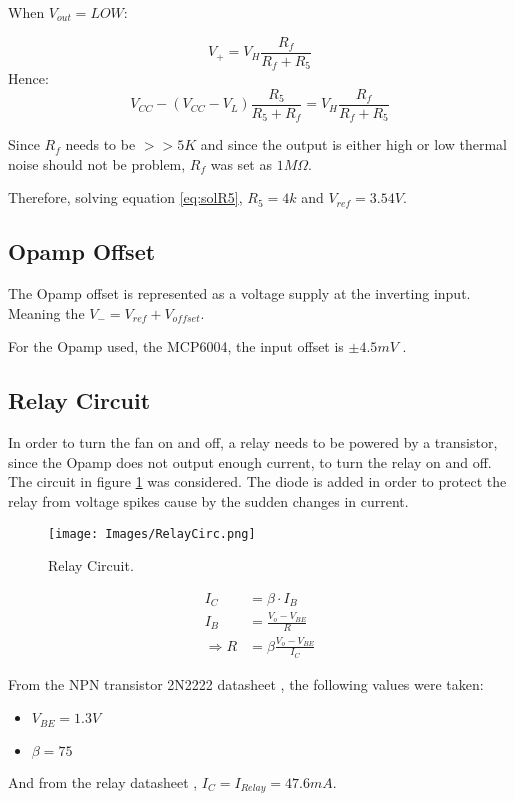 When $V_{out} = LOW$:

\begin{equation}
    V_+ = V_H\frac{R_f}{R_f + R_5}
\end{equation}
Hence:
\begin{equation}
    V_{CC}-\left (V_{CC}-V_L\right )\frac{R_5}{R_5 + R_f} = V_H\frac{R_f}{R_f + R_5}
    \label{eq:solR5}
\end{equation}

Since $R_f$ needs to be $>>5K$ and since the output is either high or low thermal noise should not be problem, $R_f$ was set as $1M\Omega$. 

Therefore, solving equation \ref{eq:solR5}, $R_5 = 4k$ and $V_{ref} = 3.54V$.
\subsection{Opamp Offset}

The Opamp offset is represented as a voltage supply at the inverting input. Meaning the  $V_{-} = V_{ref} + V_{offset}$.

For the Opamp used, the MCP6004, the input offset is $\pm 4.5mV$ \textsuperscript{\cite{MCP6001_datasheet}}. 

\subsection{Relay Circuit}
In order to turn the fan on and off, a relay needs to be powered by a transistor, since the Opamp does not output enough current, to turn the relay on and off. The circuit in figure \ref{fig:RelayCirc} was considered. The diode is added in order to protect the relay from voltage spikes cause by the sudden changes in current.

\begin{figure}[H]
    \centering
    \texttt{[image: Images/RelayCirc.png]}
    \caption{Relay Circuit.}
    \label{fig:RelayCirc}
\end{figure}

\begin{equation}
    \begin{aligned}
        I_C &= \beta \cdot I_B\\
        I_B &= \frac{V_o - V_{BE}}{R}\\ 
        \Rightarrow R &= \beta \frac{V_o - V_{BE}}{I_C}
    \end{aligned}
\end{equation}

From the NPN transistor 2N2222 datasheet \textsuperscript{\cite{2N2222_datasheet}}, the following values were taken:
\begin{itemize}
    \item $V_{BE} = 1.3V$
    \item $\beta = 75$
\end{itemize}
And from the relay datasheet \textsuperscript{\cite{ST2-DC5V-F_datasheet}}, $I_C = I_{Relay} = 47.6mA$.

